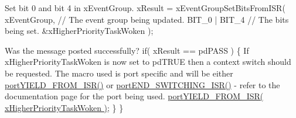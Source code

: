 \begin{DoxyPre}Set bit 0 and bit 4 in xEventGroup.
        xResult = xEventGroupSetBitsFromISR(
                            xEventGroup,    // The event group being updated.
                            BIT\_0 | BIT\_4   // The bits being set.
                            \&xHigherPriorityTaskWoken );\end{DoxyPre}



\begin{DoxyPre}Was the message posted successfully?
        if( xResult == pdPASS )
        \{
If xHigherPriorityTaskWoken is now set to pdTRUE then a context
switch should be requested.  The macro used is port specific and
will be either \hyperlink{CCS_2ARM__CM4F_2portmacro_8h_aac6850c66595efdc02a8bbb95fb4648e}{portYIELD\_FROM\_ISR()} or \hyperlink{CCS_2ARM__CM4F_2portmacro_8h_a63b994040c62c9685490a71c87a13d8a}{portEND\_SWITCHING\_ISR()} -
refer to the documentation page for the port being used.
            \hyperlink{Tasking_2ARM__CM4F_2portmacro_8h_aac6850c66595efdc02a8bbb95fb4648e}{portYIELD\_FROM\_ISR( xHigherPriorityTaskWoken )};
        \}
  \}
   \end{DoxyPre}
 